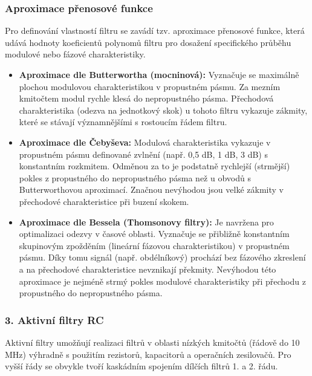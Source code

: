     \subsubsection{Aproximace přenosové funkce}
        Pro definování vlastností filtru se zavádí tzv. aproximace přenosové funkce, která udává hodnoty koeficientů polynomů filtru pro dosažení specifického průběhu modulové nebo fázové charakteristiky.
        \begin{itemize}
            \item \textbf{Aproximace dle Butterwortha (mocninová):} Vyznačuje se maximálně plochou modulovou charakteristikou v propustném pásmu. Za mezním kmitočtem modul rychle klesá do nepropustného pásma. Přechodová charakteristika (odezva na jednotkový skok) u tohoto filtru vykazuje zákmity, které se stávají významnějšími s rostoucím řádem filtru.
            \item \textbf{Aproximace dle Čebyševa:} Modulová charakteristika vykazuje v propustném pásmu definované zvlnění (např. 0,5 dB, 1 dB, 3 dB) s konstantním rozkmitem. Odměnou za to je podstatně rychlejší (strmější) pokles z propustného do nepropustného pásma než u obvodů s Butterworthovou aproximací. Značnou nevýhodou jsou velké zákmity v přechodové charakteristice při buzení skokem.
            \item \textbf{Aproximace dle Bessela (Thomsonovy filtry):} Je navržena pro optimalizaci odezvy v časové oblasti. Vyznačuje se přibližně konstantním skupinovým zpožděním (lineární fázovou charakteristikou) v propustném pásmu. Díky tomu signál (např. obdélníkový) prochází bez fázového zkreslení a na přechodové charakteristice nevznikají překmity. Nevýhodou této aproximace je nejméně strmý pokles modulové charakteristiky při přechodu z propustného do nepropustného pásma.
        \end{itemize}
    \subsubsection*{3. Aktivní filtry RC}

        Aktivní filtry umožňují realizaci filtrů v oblasti nízkých kmitočtů (řádově do 10 MHz) výhradně s použitím rezistorů, kapacitorů a operačních zesilovačů. Pro vyšší řády se obvykle tvoří kaskádním spojením dílčích filtrů 1. a 2. řádu.
        
